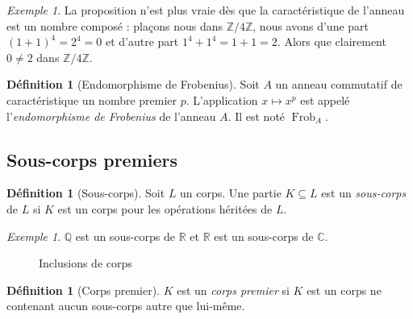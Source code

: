 \documentclass[a4paper, titlepage]{article}
\theoremstyle{definition}
\newtheorem{defi}[theo]{Définition}
\theoremstyle{remark}
\newtheorem{exem}[theo]{Exemple}
\def\Z{\mathbb Z}
\def\Q{\mathbb Q}
\def\R{\mathbb R}
\def\C{\mathbb C}
\def\frob{\operatorname{Frob}}
\begin{document}
\begin{exem}
La proposition n'est plus vraie dès que la caractéristique de l'anneau est un nombre composé : plaçons nous dans $\Z/4\Z$, nous avons d'une part $(1 + 1)^4 = 2^4 = 0$ et d'autre part $1^4 + 1^4 = 1+1 = 2$. Alors que clairement $0\neq 2$ dans $\Z/4\Z$.
\end{exem}

\begin{defi}[Endomorphisme de Frobenius]
Soit $A$ un anneau commutatif de caractéristique un nombre premier $p$. L'application $x \mapsto x^p$ est appelé l'\textit{endomorphisme de Frobenius} de l'anneau $A$. Il est noté $\frob_A$.
\end{defi}

\subsection{Sous-corps premiers}

\begin{defi}[Sous-corps]
Soit $L$ un corps. Une partie $K \subseteq L$ est un \textit{sous-corps} de $L$ si $K$ est un corps pour les opérations héritées de $L$.
\end{defi}

\begin{exem}
$\Q$ est un sous-corps de $\R$ et $\R$ est un sous-corps de $\C$.
\end{exem}

\begin{figure}[h]
\begin{center}
\caption{Inclusions de corps}
\end{center}
\end{figure}

\begin{defi}[Corps premier]
$K$ est un \textit{corps premier} si $K$ est un corps ne contenant aucun sous-corps autre que lui-même.
\end{defi}
\end{document}
